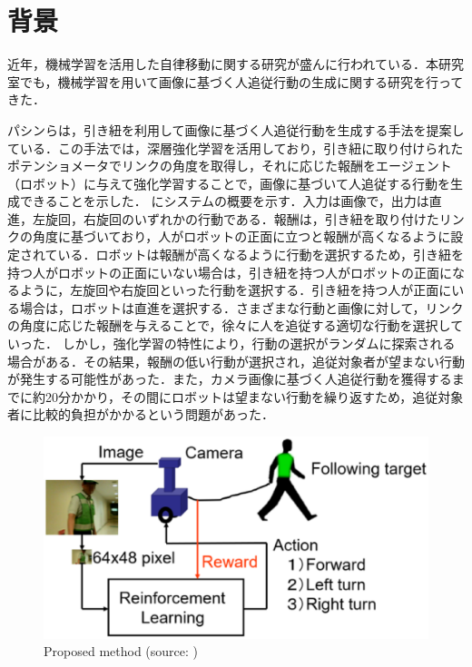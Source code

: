 
\section{背景}
  近年，機械学習を活用した自律移動に関する研究が盛んに行われている．本研究室でも，機械学習を用いて画像に基づく人追従行動の生成に関する研究を行ってきた．

  パシンら\cite{pasin1}\cite{pasin2}\cite{pasin3}は，引き紐を利用して画像に基づく人追従行動を生成する手法を提案している．この手法では，深層強化学習\cite{hado}を活用しており，引き紐に取り付けられたポテンショメータでリンクの角度を取得し，それに応じた報酬をエージェント（ロボット）に与えて強化学習\cite{leslie}することで，画像に基づいて人追従する行動を生成できることを示した．
  にシステムの概要を示す．入力は画像で，出力は直進，左旋回，右旋回のいずれかの行動である．報酬は，引き紐を取り付けたリンクの角度に基づいており，人がロボットの正面に立つと報酬が高くなるように設定されている．ロボットは報酬が高くなるように行動を選択するため，引き紐を持つ人がロボットの正面にいない場合は，引き紐を持つ人がロボットの正面になるように，左旋回や右旋回といった行動を選択する．引き紐を持つ人が正面にいる場合は，ロボットは直進を選択する．さまざまな行動と画像に対して，リンクの角度に応じた報酬を与えることで，徐々に人を追従する適切な行動を選択していった．
  しかし，強化学習の特性により，行動の選択がランダムに探索される場合がある．その結果，報酬の低い行動が選択され，追従対象者が望まない行動が発生する可能性があった．また，カメラ画像に基づく人追従行動を獲得するまでに約20分かかり，その間にロボットは望まない行動を繰り返すため，追従対象者に比較的負担がかかるという問題があった．

\newpage

  \begin{figure}[h]
    \centering
    \includegraphics[keepaspectratio, scale=0.45] {images/eps/pasin_system.eps}
    \caption[Proposed method]{Proposed method (source: \cite{pasin1})}
    \label{Fig:pasin_system}
  \end{figure}

